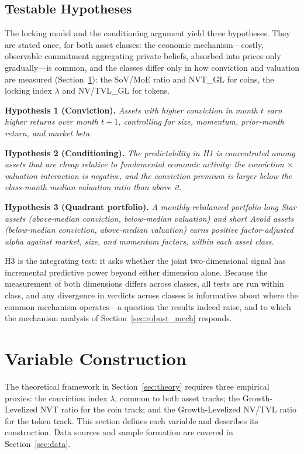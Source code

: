 \documentclass[12pt]{article}
\begin{document}
\subsection{Testable Hypotheses}
\label{sec:theory_portfolio}

The locking model and the conditioning argument yield three hypotheses. They are stated
once, for both asset classes: the economic mechanism---costly, observable commitment
aggregating private beliefs, absorbed into prices only gradually---is common, and the
classes differ only in how conviction and valuation are measured (Section~\ref{sec:measures}):
the SoV/MoE ratio and NVT\_GL for coins, the locking index $\lambda$ and NV/TVL\_GL for
tokens.

\textbf{Hypothesis 1 (Conviction).} \textit{Assets with higher conviction in month $t$
earn higher returns over month $t+1$, controlling for size, momentum, prior-month
return, and market beta.}

\textbf{Hypothesis 2 (Conditioning).} \textit{The predictability in H1 is concentrated
among assets that are cheap relative to fundamental economic activity: the
conviction $\times$ valuation interaction is negative, and the conviction premium is
larger below the class-month median valuation ratio than above it.}

\textbf{Hypothesis 3 (Quadrant portfolio).} \textit{A monthly-rebalanced portfolio long
Star assets (above-median conviction, below-median valuation) and short Avoid assets
(below-median conviction, above-median valuation) earns positive factor-adjusted alpha
against market, size, and momentum factors, within each asset class.}

H3 is the integrating test: it asks whether the joint two-dimensional signal has
incremental predictive power beyond either dimension alone. Because the measurement of
both dimensions differs across classes, all tests are run within class, and any
divergence in verdicts across classes is informative about where the common mechanism
operates---a question the results indeed raise, and to which the mechanism analysis of
Section~\ref{sec:robust_mech} responds.

\section{Variable Construction}
\label{sec:measures}

The theoretical framework in Section~\ref{sec:theory} requires three empirical proxies:
the conviction index $\lambda$, common to both asset tracks; the Growth-Levelized NVT
ratio for the coin track; and the Growth-Levelized NV/TVL ratio for the token track. This section defines
each variable and describes its construction. Data sources and sample formation are
covered in Section~\ref{sec:data}.
\end{document}
